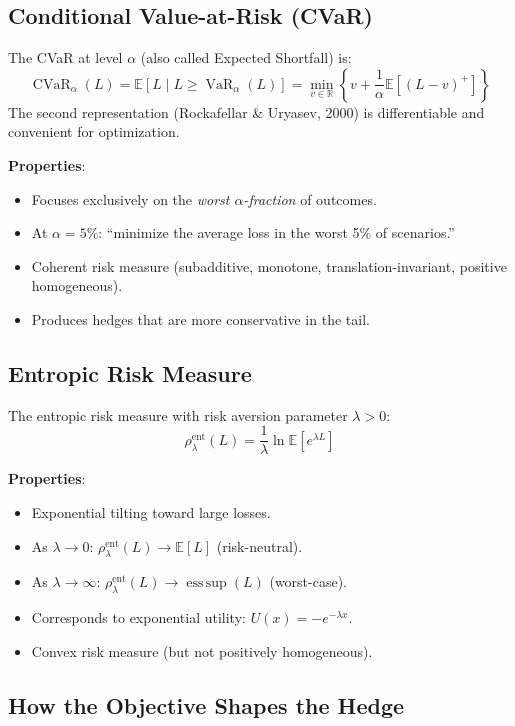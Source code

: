 \documentclass[11pt, a4paper]{article}
\theoremstyle{definition}
\theoremstyle{plain}
\theoremstyle{remark}
\newcommand{\VaR}{\operatorname{VaR}}
\newcommand{\CVaR}{\operatorname{CVaR}}
\newcommand{\EV}{\mathbb{E}}
\newcommand{\RV}{\mathbb{R}}
\begin{document}
\subsection{Conditional Value-at-Risk (CVaR)}

The CVaR at level $\alpha$ (also called Expected Shortfall) is:
\[
    \CVaR_\alpha(L) = \EV\!\left[L \mid L \geq \VaR_\alpha(L)\right]
    = \min_{v \in \RV}\left\{v + \frac{1}{\alpha}\EV\!\left[(L - v)^+\right]\right\}
\]
The second representation (Rockafellar \& Uryasev, 2000) is differentiable
and convenient for optimization.

\textbf{Properties}:
\begin{itemize}
    \item Focuses exclusively on the \emph{worst $\alpha$-fraction} of outcomes.
    \item At $\alpha = 5\%$: ``minimize the average loss in the worst 5\% of scenarios.''
    \item Coherent risk measure (subadditive, monotone, translation-invariant, positive homogeneous).
    \item Produces hedges that are more conservative in the tail.
\end{itemize}

\subsection{Entropic Risk Measure}

The entropic risk measure with risk aversion parameter $\lambda > 0$:
\[
    \rho_\lambda^{\text{ent}}(L) = \frac{1}{\lambda}\ln\EV\!\left[e^{\lambda L}\right]
\]

\textbf{Properties}:
\begin{itemize}
    \item Exponential tilting toward large losses.
    \item As $\lambda \to 0$: $\rho_\lambda^{\text{ent}}(L) \to \EV[L]$ (risk-neutral).
    \item As $\lambda \to \infty$: $\rho_\lambda^{\text{ent}}(L) \to \operatorname{ess\,sup}(L)$ (worst-case).
    \item Corresponds to exponential utility: $U(x) = -e^{-\lambda x}$.
    \item Convex risk measure (but not positively homogeneous).
\end{itemize}

\subsection{How the Objective Shapes the Hedge}
\end{document}

